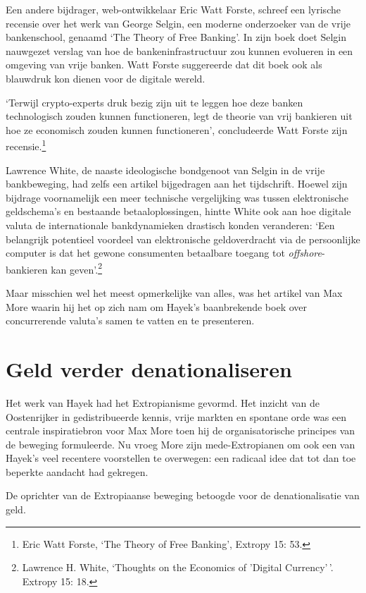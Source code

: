 \documentclass[
  a5paper,
  smalldemyvopaper,11pt,twoside,onecolumn,openright,extrafontsizes]{memoir}
\begin{document}
Een andere bijdrager, web-ontwikkelaar Eric Watt Forste, schreef een
lyrische recensie over het werk van George Selgin, een moderne
onderzoeker van de vrije bankenschool, genaamd `The Theory of Free
Banking'. In zijn boek doet Selgin nauwgezet verslag van hoe de
bankeninfrastructuur zou kunnen evolueren in een omgeving van vrije
banken. Watt Forste suggereerde dat dit boek ook als blauwdruk kon
dienen voor de digitale wereld.

`Terwijl crypto-experts druk bezig zijn uit te leggen hoe deze banken
technologisch zouden kunnen functioneren, legt de theorie van vrij
bankieren uit hoe ze economisch zouden kunnen functioneren',
concludeerde Watt Forste zijn recensie.\footnote{Eric Watt Forste, `The
  Theory of Free Banking', Extropy 15: 53.}

Lawrence White, de naaste ideologische bondgenoot van Selgin in de vrije
bankbeweging, had zelfs een artikel bijgedragen aan het tijdschrift.
Hoewel zijn bijdrage voornamelijk een meer technische vergelijking was
tussen elektronische geldschema's en bestaande betaaloplossingen, hintte
White ook aan hoe digitale valuta de internationale bankdynamieken
drastisch konden veranderen: `Een belangrijk potentieel voordeel van
elektronische geldoverdracht via de persoonlijke computer is dat het
gewone consumenten betaalbare toegang tot \emph{offshore}-bankieren kan
geven'.\footnote{Lawrence H. White, `Thoughts on the Economics of
  'Digital Currency'\,'. Extropy 15: 18.}

Maar misschien wel het meest opmerkelijke van alles, was het artikel van
Max More waarin hij het op zich nam om Hayek's baanbrekende boek over
concurrerende valuta's samen te vatten en te presenteren.

\section{Geld verder
denationaliseren}\label{geld-verder-denationaliseren}

Het werk van Hayek had het Extropianisme gevormd. Het inzicht van de
Oostenrijker in gedistribueerde kennis, vrije markten en spontane orde
was een centrale inspiratiebron voor Max More toen hij de
organisatorische principes van de beweging formuleerde. Nu vroeg More
zijn mede-Extropianen om ook een van Hayek's veel recentere voorstellen
te overwegen: een radicaal idee dat tot dan toe beperkte aandacht had
gekregen.

De oprichter van de Extropiaanse beweging betoogde voor de
denationalisatie van geld.
\end{document}
